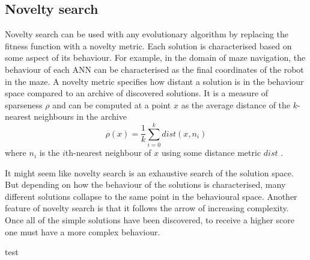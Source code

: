 \newpage
\subsection{Novelty search}
Novelty search can be used with any evolutionary algorithm by replacing the fitness
function with a novelty metric. Each solution is characterised based on some aspect
of its behaviour. For example, in the domain of maze navigation,
the behaviour of each ANN can be characterised as the
final coordinates of the robot in the maze. A novelty metric specifies how distant a solution
is in the behaviour space compared to an archive of discovered solutions. It is a measure
of sparseness $\rho$ and can be computed at a point $x$ as the average distance of the
$k$-nearest neighbours in the archive
\[
    \rho(x) = \frac{1}{k} \sum_{i=0}^{k} dist(x, n_{i})
\]
where $n_{i}$ is the $i$th-nearest neighbour of $x$ using some distance metric $dist$ \cite{novelty_alone}.

It might seem like novelty search is an exhaustive search of the solution space. But
depending on how the behaviour of the solutions is characterised, many different solutions
collapse to the same point in the behavioural space. Another feature of novelty search
is that it follows the arrow of increasing complexity. Once all of the simple solutions
have been discovered, to receive a higher score one must have a more complex behaviour.

test